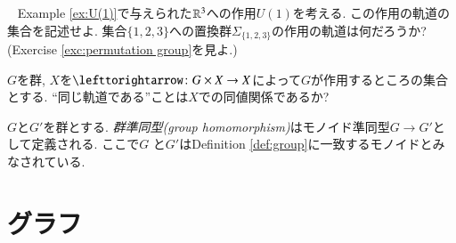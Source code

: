 \begin{exercise}~
\sexc Example \ref{ex:U(1)}で与えられた${\mathbb R}^3$への作用$U(1)$を考える. この作用の軌道の集合を記述せよ.
\next 集合$\{1,2,3\}$への置換群$\Sigma_{\{1,2,3\}}$の作用の軌道は何だろうか? (Exercise \ref{exc:permutation group}を見よ.)
\endsexc
\end{exercise}

\begin{exercise}
$G$を群, $X$を$\acts\taking G\times X\to X$によって$G$が作用するところの集合とする. ``同じ軌道である''ことは$X$での同値関係であるか?
\end{exercise}

\begin{definition}\label{def:group homomorphism}


$G$と$G'$を群とする. \emph{群準同型(group homomorphism)}はモノイド準同型$G\to G'$として定義される. ここで$G$ と$G'$はDefinition \ref{def:group}に一致するモノイドとみなされている.

\end{definition}


\section{グラフ}\label{sec:graphs}


